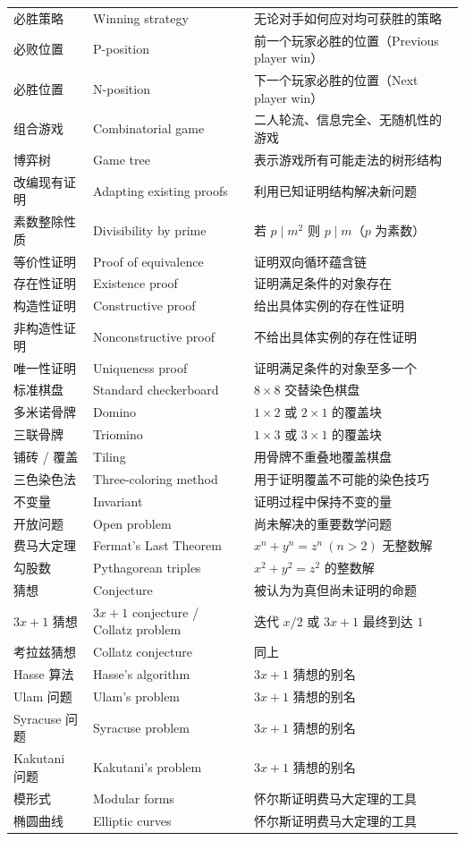 \documentclass[UTF8,11pt,a4paper]{ctexbook}   %
\theoremstyle{definition}
\begin{document}
\begin{longtable}{|p{4.8cm}|p{4.8cm}|p{4.8cm}|}
必胜策略 & Winning strategy & 无论对手如何应对均可获胜的策略 \\
必败位置 & P-position & 前一个玩家必胜的位置（Previous player win） \\
必胜位置 & N-position & 下一个玩家必胜的位置（Next player win） \\
组合游戏 & Combinatorial game & 二人轮流、信息完全、无随机性的游戏 \\
博弈树 & Game tree & 表示游戏所有可能走法的树形结构 \\
改编现有证明 & Adapting existing proofs & 利用已知证明结构解决新问题 \\
素数整除性质 & Divisibility by prime & 若 $p\mid m^2$ 则 $p\mid m$（$p$ 为素数） \\
\hline
等价性证明 & Proof of equivalence & 证明双向循环蕴含链 \\
存在性证明 & Existence proof & 证明满足条件的对象存在 \\
构造性证明 & Constructive proof & 给出具体实例的存在性证明 \\
非构造性证明 & Nonconstructive proof & 不给出具体实例的存在性证明 \\
唯一性证明 & Uniqueness proof & 证明满足条件的对象至多一个 \\
标准棋盘 & Standard checkerboard & $8\times 8$ 交替染色棋盘 \\
多米诺骨牌 & Domino & $1\times 2$ 或 $2\times 1$ 的覆盖块 \\
三联骨牌 & Triomino & $1\times 3$ 或 $3\times 1$ 的覆盖块 \\
铺砖 / 覆盖 & Tiling & 用骨牌不重叠地覆盖棋盘 \\
三色染色法 & Three-coloring method & 用于证明覆盖不可能的染色技巧 \\
不变量 & Invariant & 证明过程中保持不变的量 \\
开放问题 & Open problem & 尚未解决的重要数学问题 \\
费马大定理 & Fermat's Last Theorem & $x^n+y^n=z^n\ (n>2)$ 无整数解 \\
勾股数 & Pythagorean triples & $x^2+y^2=z^2$ 的整数解 \\
猜想 & Conjecture & 被认为为真但尚未证明的命题 \\
$3x+1$ 猜想 & $3x+1$ conjecture / Collatz problem & 迭代 $x/2$ 或 $3x+1$ 最终到达 $1$ \\
考拉兹猜想 & Collatz conjecture & 同上 \\
Hasse 算法 & Hasse's algorithm & $3x+1$ 猜想的别名 \\
Ulam 问题 & Ulam's problem & $3x+1$ 猜想的别名 \\
Syracuse 问题 & Syracuse problem & $3x+1$ 猜想的别名 \\
Kakutani 问题 & Kakutani's problem & $3x+1$ 猜想的别名 \\
模形式 & Modular forms & 怀尔斯证明费马大定理的工具 \\
椭圆曲线 & Elliptic curves & 怀尔斯证明费马大定理的工具 \\
\hline
\end{longtable}
\end{document}
